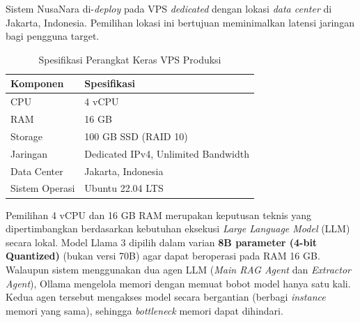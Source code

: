 Sistem NusaNara di-\textit{deploy} pada VPS \textit{dedicated} dengan lokasi
\textit{data center} di Jakarta, Indonesia. Pemilihan lokasi ini bertujuan
meminimalkan latensi jaringan bagi pengguna target.

\begin{table}[H]
\centering
\caption{Spesifikasi Perangkat Keras VPS Produksi}
\label{tab:spesifikasi_hw}
\begin{tabular}{ll}
\toprule
\textbf{Komponen} & \textbf{Spesifikasi} \\
\midrule
CPU & 4 vCPU \\
RAM & 16 GB \\
Storage & 100 GB SSD (RAID 10) \\
Jaringan & Dedicated IPv4, Unlimited Bandwidth \\
Data Center & Jakarta, Indonesia \\
Sistem Operasi & Ubuntu 22.04 LTS \\
\bottomrule
\end{tabular}
\end{table}

Pemilihan 4 vCPU dan 16 GB RAM merupakan keputusan teknis yang dipertimbangkan
berdasarkan kebutuhan eksekusi \textit{Large Language Model} (LLM) secara lokal.
Model Llama 3 dipilih dalam varian \textbf{8B parameter (4-bit Quantized)}
(bukan versi 70B) agar dapat beroperasi pada RAM 16 GB. Walaupun sistem menggunakan
dua agen LLM (\textit{Main RAG Agent} dan \textit{Extractor Agent}), Ollama mengelola
memori dengan memuat bobot model hanya satu kali. Kedua agen tersebut mengakses
model secara bergantian (berbagi \textit{instance} memori yang sama), sehingga
\textit{bottleneck} memori dapat dihindari.

